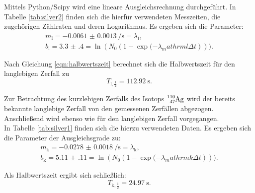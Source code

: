 Mittels Python/Scipy \cite{scipy} wird eine lineare Ausgleichsrechnung durchgeführt.
In Tabelle \ref{tab:silver2} finden sich die hierfür verwendeten Messzeiten, die zugehörigen Zählraten und deren Logarithmus.
Es ergeben sich die Parameter:
\begin{gather*}
	m_{\mathrm{l}}= \SI{-0.0061(13)}{\per\second}=\lambda_\mathrm{l}\text{,}\\
	b_{\mathrm{l}}=\num{3.3(4)}=\ln{(N_0 \left(1- \exp{(-\lambda_mathrm{l} \Delta t}\right)))}\text{.}
\end{gather*}

Nach Gleichung \eqref{eqn:halbwertszeit} berechnet sich die Halbwertszeit für den langlebigen Zerfall zu
\begin{equation}
	T_{\mathrm{l},\frac{1}{2}}=\SI{112.92}{\second}\text{.}
\end{equation}


Zur Betrachtung des kurzlebigen Zerfalls des Isotops $\ce{^{110}_47Ag}$ wird der bereits bekannte langlebige Zerfall von den gemessenen Zerfällen abgezogen.
Anschließend wird ebenso wie für den langlebigen Zerfall vorgegangen.\\
In Tabelle \ref{tab:silver1} finden sich die hierzu verwendeten Daten.
Es ergeben sich die Parameter der Ausgleichsgrade zu:
\begin{align*}
	m_{\mathrm{k}}= \SI{-0.0278(18)}{\per\second}=\lambda_\mathrm{k}\text{,}\\
	b_{\mathrm{k}}=\num{5.11(11)}=\ln{(N_0 \left(1- \exp{(-\lambda_mathrm{k} \Delta t}\right)))}\text{.}
\end{align*}

Als Halbwertszeit ergibt sich schließlich:
\begin{equation}
	T_{\mathrm{k},\frac{1}{2}}=\SI{24.97}{\second}\text{.}
\end{equation}

